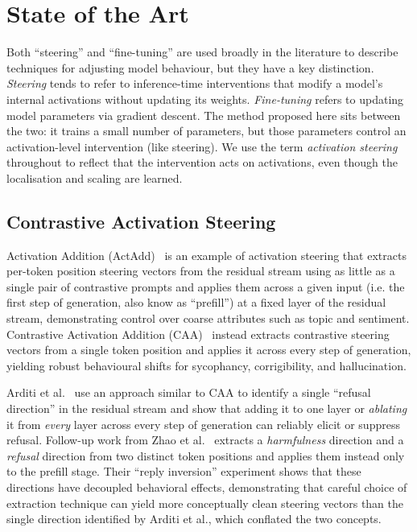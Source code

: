\section{State of the Art}

Both ``steering'' and ``fine-tuning'' are used broadly in the literature to describe techniques for adjusting model behaviour, but they have a key distinction. \emph{Steering} tends to refer to inference-time interventions that modify a model's internal activations without updating its weights. \emph{Fine-tuning} refers to updating model parameters via gradient descent. The method proposed here sits between the two: it trains a small number of parameters, but those parameters control an activation-level intervention (like steering). We use the term \emph{activation steering} throughout to reflect that the intervention acts on activations, even though the localisation and scaling are learned.

\subsection{Contrastive Activation Steering}

Activation Addition (ActAdd)~\cite{turner2025actadd} is an example of activation steering that extracts per-token position steering vectors from the residual stream using as little as a single pair of contrastive prompts and applies them across a given input (i.e. the first step of generation, also know as ``prefill'') at a fixed layer of the residual stream, demonstrating control over coarse attributes such as topic and sentiment.
Contrastive Activation Addition (CAA)~\cite{rimsky2024caa} instead extracts contrastive steering vectors from a single token position and applies it across every step of generation, yielding robust behavioural shifts for sycophancy, corrigibility, and hallucination.

Arditi et al.~\cite{arditi2024refusal} use an approach similar to CAA to identify a single ``refusal direction'' in the residual stream and show that adding it to one layer or \emph{ablating} it from \emph{every} layer across every step of generation can reliably elicit or suppress refusal. Follow-up work from Zhao et al.~\cite{zhao2025harmfulness} extracts a \emph{harmfulness} direction and a \emph{refusal} direction from two distinct token positions and applies them instead only to the prefill stage. Their ``reply inversion'' experiment shows that these directions have decoupled behavioral effects, demonstrating that careful choice of extraction technique can yield more conceptually clean steering vectors than the single direction identified by Arditi et al., which conflated the two concepts.

